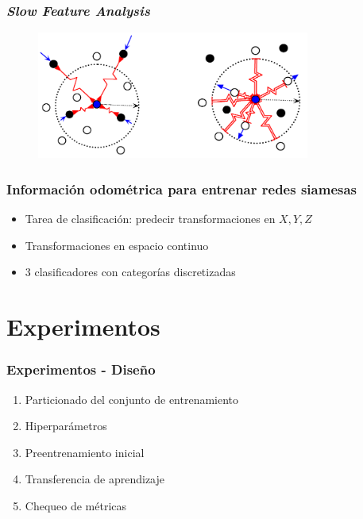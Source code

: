 \documentclass{beamer}
\begin{document}
\begin{frame}[plain]
\frametitle{\textit{Slow Feature Analysis}}
\begin{figure}
    \centering
    \includegraphics[width=0.8\textwidth]{images/example_contrastiveloss.png}
\end{figure}
\end{frame}





\begin{frame}[plain]
\frametitle{Información odométrica para entrenar redes siamesas}
\begin{itemize}
    \item Tarea de clasificación: predecir transformaciones en \(X, Y, Z\)
    \item Transformaciones en espacio continuo 
    \item 3 clasificadores con categorías discretizadas
\end{itemize}
\end{frame}





\section{Experimentos}
\begin{frame}[plain]
\frametitle{Experimentos - Diseño}
\begin{enumerate}
    \item Particionado del conjunto de entrenamiento
    \item Hiperparámetros
    \item Preentrenamiento inicial
    \item Transferencia de aprendizaje
    \item Chequeo de métricas
\end{enumerate}
\end{frame}
\end{document}
